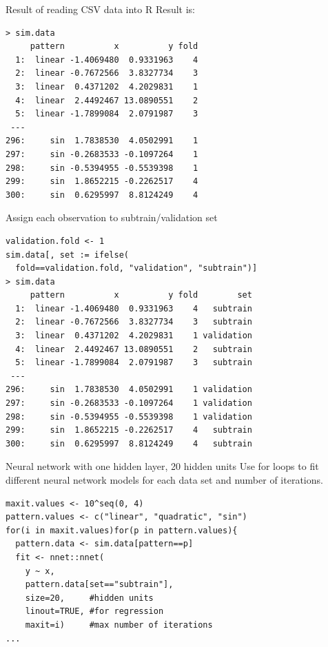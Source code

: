 \documentclass{article}
\begin{document}
{Result of reading CSV data into R}
  Result is:
\begin{verbatim}
> sim.data
     pattern          x          y fold
  1:  linear -1.4069480  0.9331963    4
  2:  linear -0.7672566  3.8327734    3
  3:  linear  0.4371202  4.2029831    1
  4:  linear  2.4492467 13.0890551    2
  5:  linear -1.7899084  2.0791987    3
 ---                                   
296:     sin  1.7838530  4.0502991    1
297:     sin -0.2683533 -0.1097264    1
298:     sin -0.5394955 -0.5539398    1
299:     sin  1.8652215 -0.2262517    4
300:     sin  0.6295997  8.8124249    4
\end{verbatim}

{Assign each observation to subtrain/validation set}
\begin{verbatim}
validation.fold <- 1
sim.data[, set := ifelse(
  fold==validation.fold, "validation", "subtrain")]
> sim.data
     pattern          x          y fold        set
  1:  linear -1.4069480  0.9331963    4   subtrain
  2:  linear -0.7672566  3.8327734    3   subtrain
  3:  linear  0.4371202  4.2029831    1 validation
  4:  linear  2.4492467 13.0890551    2   subtrain
  5:  linear -1.7899084  2.0791987    3   subtrain
 ---                                              
296:     sin  1.7838530  4.0502991    1 validation
297:     sin -0.2683533 -0.1097264    1 validation
298:     sin -0.5394955 -0.5539398    1 validation
299:     sin  1.8652215 -0.2262517    4   subtrain
300:     sin  0.6295997  8.8124249    4   subtrain
\end{verbatim}

{Neural network with one hidden layer, 20 hidden units}
  Use for loops to fit different neural network models for each data
  set and number of iterations. 
\begin{verbatim}
maxit.values <- 10^seq(0, 4)
pattern.values <- c("linear", "quadratic", "sin")
for(i in maxit.values)for(p in pattern.values){
  pattern.data <- sim.data[pattern==p]
  fit <- nnet::nnet(
    y ~ x,
    pattern.data[set=="subtrain"],
    size=20,     #hidden units
    linout=TRUE, #for regression
    maxit=i)     #max number of iterations
...
\end{verbatim}
\end{document}
